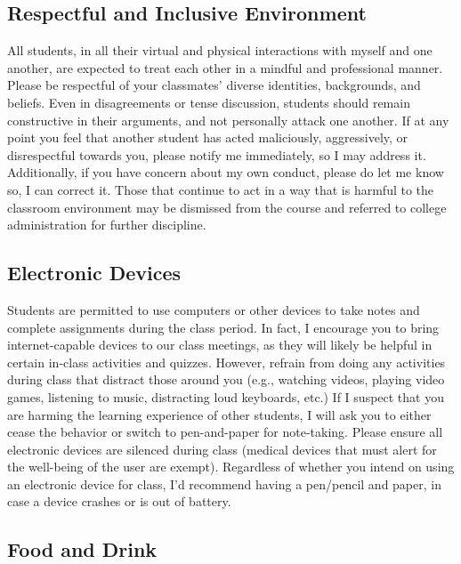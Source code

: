 \documentclass[
  12pt,
  letterpaper,
]{scrartcl}
\begin{document}
\subsection{Respectful and Inclusive
Environment}\label{respectful-and-inclusive-environment}

All students, in all their virtual and physical interactions with myself
and one another, are expected to treat each other in a mindful and
professional manner. Please be respectful of your classmates' diverse
identities, backgrounds, and beliefs. Even in disagreements or tense
discussion, students should remain constructive in their arguments, and
not personally attack one another. If at any point you feel that another
student has acted maliciously, aggressively, or disrespectful towards
you, please notify me immediately, so I may address it. Additionally, if
you have concern about my own conduct, please do let me know so, I can
correct it. Those that continue to act in a way that is harmful to the
classroom environment may be dismissed from the course and referred to
college administration for further discipline.

\subsection{Electronic Devices}\label{electronic-devices}

Students are permitted to use computers or other devices to take notes
and complete assignments during the class period. In fact, I encourage
you to bring internet-capable devices to our class meetings, as they
will likely be helpful in certain in-class activities and quizzes.
However, refrain from doing any activities during class that distract
those around you (e.g., watching videos, playing video games, listening
to music, distracting loud keyboards, etc.) If I suspect that you are
harming the learning experience of other students, I will ask you to
either cease the behavior or switch to pen-and-paper for note-taking.
Please ensure all electronic devices are silenced during class (medical
devices that must alert for the well-being of the user are exempt).
Regardless of whether you intend on using an electronic device for
class, I'd recommend having a pen/pencil and paper, in case a device
crashes or is out of battery.

\subsection{Food and Drink}\label{food-and-drink}
\end{document}
